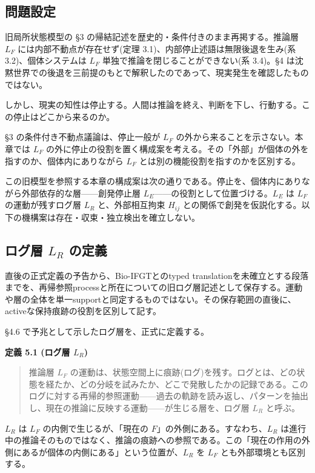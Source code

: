 \bigskip


\subsection{問題設定}


旧局所状態模型の \S{}3 の帰結記述を歴史的・条件付きのまま再掲する。推論層 $L_F$ には内部不動点が存在せず(定理 3.1)、内部停止述語は無限後退を生み(系 3.2)、個体システムは $L_F$ 単独で推論を閉じることができない(系 3.4)。\S{}4 は沈黙世界での後退を三前提のもとで解釈したのであって、現実発生を確認したものではない。

しかし、現実の知性は停止する。人間は推論を終え、判断を下し、行動する。この停止はどこから来るのか。

\S{}3 の条件付き不動点議論は、停止一般が $L_F$ の外から来ることを示さない。本章では $L_F$ の外に停止の役割を置く構成案を考える。その「外部」が個体の外を指すのか、個体内にありながら $L_F$ とは別の機能役割を指すのかを区別する。

この旧模型を参照する本章の構成案は次の通りである。停止を、個体内にありながら外部依存的な層——創発停止層 $L_E$——の役割として位置づける。$L_E$ は $L_F$ の運動が残すログ層 $L_R$ と、外部相互拘束 $H_{ij}$ との関係で創発を仮説化する。以下の機構案は存在・収束・独立検出を確立しない。

\bigskip


\subsection{ログ層 $L_R$ の定義}


直後の正式定義の予告から、Bio-IFGTとのtyped translationを未確立とする段落までを、再帰参照processと所在についての旧ログ層記述として保存する。運動や層の全体を単一supportと同定するものではない。その保存範囲の直後に、activeな保持痕跡の役割を区別して記す。

\S{}4.6 で予兆として示したログ層を、正式に定義する。

\textbf{定義 5.1 (ログ層 $L_R$)}

\begin{quote}
推論層 $L_F$ の運動は、状態空間上に痕跡(ログ)を残す。ログとは、どの状態を経たか、どの分岐を試みたか、どこで発散したかの記録である。このログに対する再帰的参照運動——過去の軌跡を読み返し、パターンを抽出し、現在の推論に反映する運動——が生じる層を、ログ層 $L_R$ と呼ぶ。
\end{quote}


$L_R$ は $L_F$ の内側で生じるが、「現在の $F$」の外側にある。すなわち、$L_R$ は進行中の推論そのものではなく、推論の痕跡への参照である。この「現在の作用の外側にあるが個体の内側にある」という位置が、$L_R$ を $L_F$ とも外部環境とも区別する。

